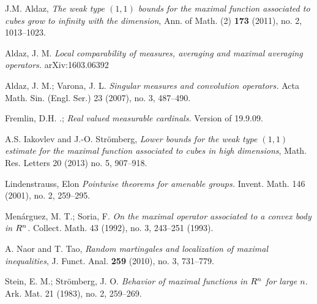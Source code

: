 \documentclass[12pt]{amsart}
\theoremstyle{definition}
\theoremstyle{parrafo}
\begin{document}
\begin{thebibliography}{WWW}

 J.M. Aldaz,   \textit{The  weak type $(1,1)$ bounds for the 
maximal function associated to cubes
grow to infinity with the dimension}, Ann. of Math. (2) \textbf{173}
(2011), no. 2, 1013--1023.



 Aldaz, J. M.
{\em Local comparability of measures, averaging and  maximal averaging operators.} 
arXiv:1603.06392


   Aldaz,  J. M.;  Varona,  J. L. {\em Singular measures and convolution
operators.} Acta Math. Sin. (Engl. Ser.) 23 (2007), no. 3, 487--490.




 Fremlin, D.H. .;  {\em Real valued measurable cardinals.} 
Version of 19.9.09.



 A.S. Iakovlev and J.-O. Str\"omberg,
 \textit{Lower bounds for the weak type $(1,1)$
estimate for the maximal function associated
to cubes in high dimensions}, Math. Res. Letters 20 (2013) no. 5, 907--918.


 Lindenstrauss, Elon {\em Pointwise theorems for amenable groups.} Invent. Math. 146 (2001), no. 2, 259--295.
 


 Men\'arguez, M. T.; Soria, F. 
{\em On the maximal operator associated to a convex body in $R\sp n$.}  
Collect. Math.  43  (1992),  no. 3, 243--251 (1993).



 A. Naor and T. Tao, \textit{Random martingales and localization of maximal inequalities},
 J. Funct. Anal. \textbf{259} (2010), no. 3, 731--779.


  Stein, E. M.; Str\"{o}mberg, J. O. {\em Behavior of maximal functions in $R\sp{n}$
 for large $n$.} Ark. Mat. 21 (1983), no. 2, 259--269.
 
 \end{thebibliography}
\end{document}

